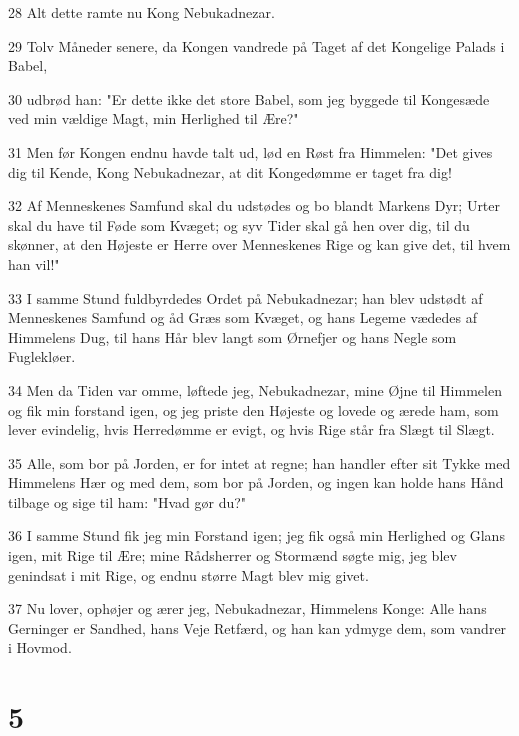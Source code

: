 \par 28 Alt dette ramte nu Kong Nebukadnezar.
\par 29 Tolv Måneder senere, da Kongen vandrede på Taget af det Kongelige Palads i Babel,
\par 30 udbrød han: "Er dette ikke det store Babel, som jeg byggede til Kongesæde ved min vældige Magt, min Herlighed til Ære?"
\par 31 Men før Kongen endnu havde talt ud, lød en Røst fra Himmelen: "Det gives dig til Kende, Kong Nebukadnezar, at dit Kongedømme er taget fra dig!
\par 32 Af Menneskenes Samfund skal du udstødes og bo blandt Markens Dyr; Urter skal du have til Føde som Kvæget; og syv Tider skal gå hen over dig, til du skønner, at den Højeste er Herre over Menneskenes Rige og kan give det, til hvem han vil!"
\par 33 I samme Stund fuldbyrdedes Ordet på Nebukadnezar; han blev udstødt af Menneskenes Samfund og åd Græs som Kvæget, og hans Legeme vædedes af Himmelens Dug, til hans Hår blev langt som Ørnefjer og hans Negle som Fuglekløer.
\par 34 Men da Tiden var omme, løftede jeg, Nebukadnezar, mine Øjne til Himmelen og fik min forstand igen, og jeg priste den Højeste og lovede og ærede ham, som lever evindelig, hvis Herredømme er evigt, og hvis Rige står fra Slægt til Slægt.
\par 35 Alle, som bor på Jorden, er for intet at regne; han handler efter sit Tykke med Himmelens Hær og med dem, som bor på Jorden, og ingen kan holde hans Hånd tilbage og sige til ham: "Hvad gør du?"
\par 36 I samme Stund fik jeg min Forstand igen; jeg fik også min Herlighed og Glans igen, mit Rige til Ære; mine Rådsherrer og Stormænd søgte mig, jeg blev genindsat i mit Rige, og endnu større Magt blev mig givet.
\par 37 Nu lover, ophøjer og ærer jeg, Nebukadnezar, Himmelens Konge: Alle hans Gerninger er Sandhed, hans Veje Retfærd, og han kan ydmyge dem, som vandrer i Hovmod.

\chapter{5}

